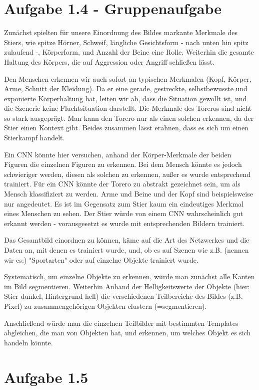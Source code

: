 \documentclass{article}
\begin{document}
\section*{Aufgabe 1.4 - Gruppenaufgabe}

Zunächst spielten für unsere Einordnung des Bildes markante Merkmale des Stiers, wie spitze Hörner, Schweif, längliche Gesichtsform - nach unten hin spitz zulaufend -, Körperform, und Anzahl der Beine eine Rolle. Weiterhin die gesamte Haltung des Körpers, die auf Aggression oder Angriff schließen lässt.

Den Menschen erkennen wir auch sofort an typischen Merkmalen (Kopf, Körper, Arme, Schnitt der Kleidung).
Da er eine gerade, gestreckte, selbstbewusste und exponierte Körperhaltung hat, leiten wir ab, 
dass die Situation gewollt ist, und die Szenerie keine Fluchtsituation darstellt. 
Die Merkmale des Toreros sind nicht so stark ausgeprägt. 
Man kann den Torero nur als einen solchen erkennen, da der Stier einen Kontext gibt.
Beides zusammen lässt erahnen, dass es sich um einen Stierkampf handelt.

Ein CNN könnte hier versuchen, anhand der Körper-Merkmale der beiden Figuren die einzelnen Figuren zu erkennen.
Bei dem Mensch könnte es jedoch schwieriger werden, diesen als solchen zu erkennen, außer es wurde entsprechend trainiert.
Für ein CNN könnte der Torero zu abstrakt gezeichnet sein, um als Mensch klassifiziert zu werden. 
Arme und Beine und der Kopf sind beispielsweise nur angedeutet. 
Es ist im Gegensatz zum Stier kaum ein eindeutiges Merkmal eines Menschen zu sehen.
Der Stier würde von einem CNN wahrscheinlich gut erkannt werden
- vorausgesetzt es wurde mit entsprechenden Bildern trainiert.

Das Gesamtbild einordnen zu können, käme auf die Art des Netzwerkes und die Daten an,
mit denen es trainiert wurde, und, ob es auf Szenen wie z.B. (nennen wir es:) "Sportarten"
oder auf einzelne Objekte trainiert wurde.

Systematisch, um einzelne Objekte zu erkennen, würde man zunächst alle Kanten im Bild segmentieren. 
Weiterhin Anhand der Helligkeitswerte der Objekte (hier: Stier dunkel, Hintergrund hell) 
die verschiedenen Teilbereiche des Bildes (z.B. Pixel) zu zusammengehörigen Objekten clustern (=segmentieren).

Anschließend würde man die einzelnen Teilbilder mit bestimmten Templates abgleichen, die man von Objekten hat, und erkennen, um welches Objekt es sich handeln könnte.

\section*{Aufgabe 1.5}
\end{document}
